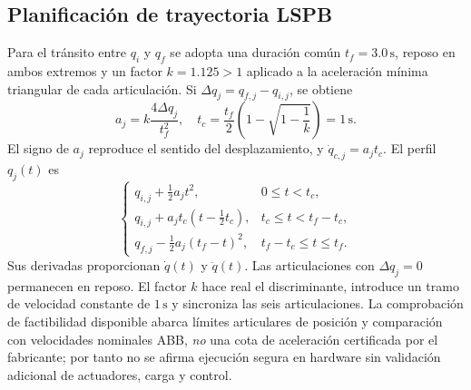 \documentclass[conference,letterpaper]{IEEEtran}
\begin{document}
	\subsection{Planificación de trayectoria LSPB}
	Para el tránsito entre \(q_i\) y \(q_f\) se adopta una duración común \(t_f=3.0\,\mathrm{s}\), reposo en ambos extremos y un factor \(k=1.125>1\) aplicado a la aceleración mínima triangular de cada articulación. Si \(\Delta q_j=q_{f,j}-q_{i,j}\), se obtiene
	\begin{equation}
		a_j=k\frac{4\Delta q_j}{t_f^2},\quad
		t_c=\frac{t_f}{2}\left(1-\sqrt{1-\frac{1}{k}}\right)=1\,\mathrm{s}.
		\label{eq:acel}
	\end{equation}
	El signo de \(a_j\) reproduce el sentido del desplazamiento, y \(\dot q_{c,j}=a_jt_c\). El perfil \(q_j(t)\) es
	\begin{equation}
		\begin{cases}
			q_{i,j}+\tfrac12a_jt^2,&0\le t<t_c,\\
			q_{i,j}+a_jt_c(t-\tfrac12t_c),&t_c\le t<t_f-t_c,\\
			q_{f,j}-\tfrac12a_j(t_f-t)^2,&t_f-t_c\le t\le t_f.
		\end{cases}
		\label{eq:lspb}
	\end{equation}
	Sus derivadas proporcionan \(\dot q(t)\) y \(\ddot q(t)\). Las articulaciones con \(\Delta q_j=0\) permanecen en reposo. El factor \(k\) hace real el discriminante, introduce un tramo de velocidad constante de \(1\,\mathrm{s}\) y sincroniza las seis articulaciones. La comprobación de factibilidad disponible abarca límites articulares de posición y comparación con velocidades nominales ABB, \emph{no} una cota de aceleración certificada por el fabricante; por tanto no se afirma ejecución segura en hardware sin validación adicional de actuadores, carga y control.
	
\end{document}
